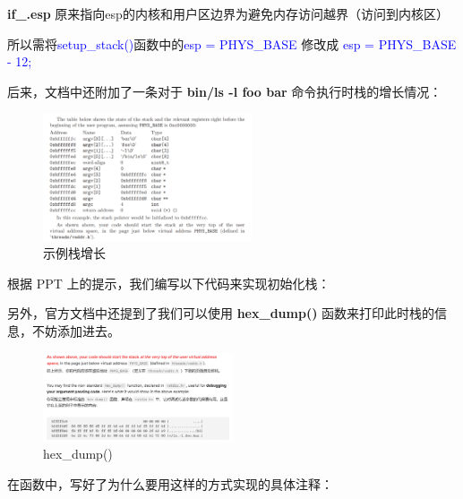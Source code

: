 \documentclass[14pt,a4paper,UTF8,twoside]{article}
\renewcommand{\texttt}[1]{\textcolor{blue}{\ttfamily #1}}
\begin{document}
\begin{ctt}
\textbf{if\_.esp} 原来指向esp的内核和用户区边界为避免内存访问越界（访问到内核区）

所以需将\texttt{setup\_stack()}函数中的\texttt{esp = PHYS\_BASE}
修改成 \texttt{*esp = PHYS\_BASE - 12;}

后来，文档中还附加了一条对于 \textbf{bin/ls -l foo bar} 命令执行时栈的增长情况：
\end{ctt}

\begin{figure}[H]
    \centering
    \includegraphics[width=0.55\textwidth]{img5/example.png}
    \caption{示例栈增长}
    \label{fig:ls}
\end{figure}

根据 PPT 上的提示，我们编写以下代码来实现初始化栈：

另外，官方文档中还提到了我们可以使用 \textbf{hex\_dump()} 函数来打印此时栈的信息，不妨添加进去。

\begin{figure}[H]
    \centering
    \includegraphics[width=0.5\textwidth]{img5/tips.png}
    \caption{hex\_dump()}
    \label{fig:hex}
\end{figure}

在函数中，写好了为什么要用这样的方式实现的具体注释：
\end{document}
